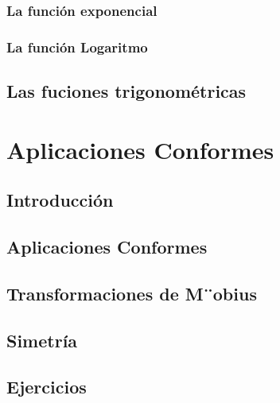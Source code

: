 \documentclass[]{book}
\theoremstyle{definition}
\theoremstyle{definition}
\theoremstyle{definition}
\theoremstyle{remark}
\begin{document}
\hypertarget{la-funciuxf3n-exponencial}{%
\subsection{La función exponencial}\label{la-funciuxf3n-exponencial}}

\hypertarget{la-funciuxf3n-logaritmo}{%
\subsection{La función Logaritmo}\label{la-funciuxf3n-logaritmo}}

\hypertarget{las-fuciones-trigonomuxe9tricas}{%
\section{Las fuciones trigonométricas}\label{las-fuciones-trigonomuxe9tricas}}

\hypertarget{aplicaciones-conformes}{%
\chapter{Aplicaciones Conformes}\label{aplicaciones-conformes}}

\hypertarget{introducciuxf3n}{%
\section{Introducción}\label{introducciuxf3n}}

\hypertarget{aplicaciones-conformes-1}{%
\section{Aplicaciones Conformes}\label{aplicaciones-conformes-1}}

\hypertarget{transformaciones-de-mobius}{%
\section{Transformaciones de M¨obius}\label{transformaciones-de-mobius}}

\hypertarget{simetruxeda}{%
\section{Simetría}\label{simetruxeda}}

\hypertarget{ejercicios-2}{%
\section{Ejercicios}\label{ejercicios-2}}
\end{document}

